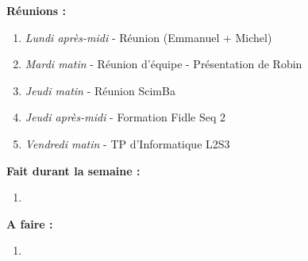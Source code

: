 \textbf{Réunions :}
\begin{enumerate}[label=\textbullet]
	\item \textit{Lundi après-midi} - Réunion (Emmanuel + Michel)
	\item \textit{Mardi matin} - Réunion d'équipe - Présentation de Robin
	\item \textit{Jeudi matin} - Réunion ScimBa
	\item \textit{Jeudi après-midi} - Formation Fidle Seq 2
	\item \textit{Vendredi matin} - TP d'Informatique L2S3
\end{enumerate}
\textbf{Fait durant la semaine :}
\begin{enumerate}[label=\textbullet]
	\item 
\end{enumerate}
\textbf{A faire :}
\begin{enumerate}[label=\textbullet]
	\item 
\end{enumerate}